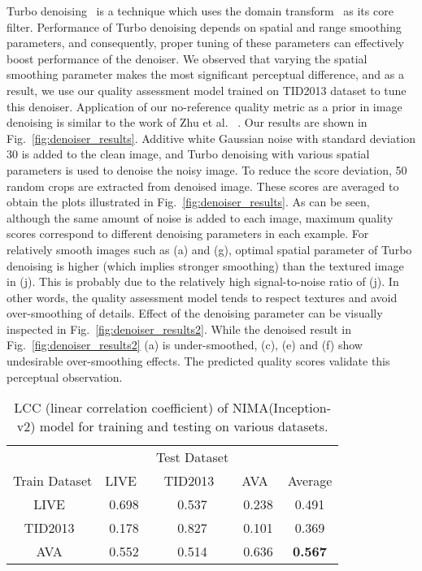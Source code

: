 \documentclass[10pt,twocolumn,twoside]{IEEEtran}
\begin{document}
Turbo denoising~\cite{wong2016turbo} is a technique which uses the domain transform~\cite{gastal2011domain} as its core filter. Performance of Turbo denoising depends on spatial and range smoothing parameters, and consequently, proper tuning of these parameters can effectively boost performance of the denoiser. We observed that varying the spatial smoothing parameter makes the most significant perceptual difference, and as a result, we use our quality assessment model trained on TID2013 dataset to tune this denoiser. Application of our no-reference quality metric as a prior in image denoising is similar to the work of Zhu et al. ~\cite{zhu2009no, zhu2010automatic}. Our results are shown in Fig.~\ref{fig:denoiser_results}. Additive white Gaussian noise with standard deviation 30 is added to the clean image, and Turbo denoising with various spatial parameters is used to denoise the noisy image. To reduce the score deviation, 50 random crops are extracted from denoised image. These scores are averaged to obtain the plots illustrated in Fig.~\ref{fig:denoiser_results}. As can be seen, although the same amount of noise is added to each image, maximum quality scores correspond to different denoising parameters in each example. For relatively smooth images such as (a) and (g), optimal spatial parameter of Turbo denoising is higher (which implies stronger smoothing) than the textured image in (j). This is probably due to the relatively high signal-to-noise ratio of (j). In other words, the quality assessment model tends to respect textures and avoid over-smoothing of details. Effect of the denoising parameter can be visually inspected in Fig.~\ref{fig:denoiser_results2}. While the denoised result in Fig.~\ref{fig:denoiser_results2} (a) is under-smoothed, (c), (e) and (f) show undesirable over-smoothing effects. The predicted quality scores validate this perceptual observation.

\begin{table}[!t]
\begin{center}
\captionsetup{width=0.48\textwidth}
\caption{LCC (linear correlation coefficient) of NIMA(Inception-v2) model for training and testing on various datasets.}
\begin{tabular}{c|cccc}    \toprule
 & & Test Dataset & \\ \cline{2-4}
Train Dataset  & LIVE~\cite{ghadiyaram2016massive} & TID2013~\cite{ponomarenko2013color}  & AVA~\cite{murray2012ava} & Average \\\midrule
LIVE~\cite{ghadiyaram2016massive} & 0.698 & 0.537 &   0.238 & 0.491\\ 
TID2013~\cite{ponomarenko2013color}  & 0.178 & 0.827 &   0.101 &  0.369\\
AVA~\cite{murray2012ava} & 0.552 & 0.514 & 0.636 & \textbf{0.567}\\\bottomrule
 \hline
\end{tabular}
\label{tab:cross_validation_lcc}
\end{center}
\end{table}
\end{document}
